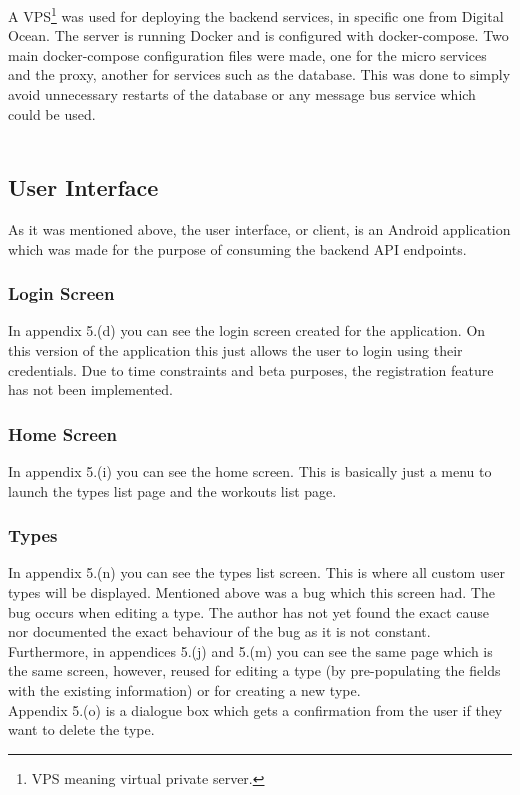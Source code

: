 \documentclass{article}
\newcommand{\vspaceconst}{-2ex}
\begin{document}
\begin{multicols}{2}
A VPS\footnote{VPS meaning virtual private server.} was used for deploying the backend services, in specific one from Digital Ocean\cite{digitalOcean}. The server is running Docker and is configured with docker-compose. Two main docker-compose configuration files were made, one for the micro services and the proxy, another for services such as the database. This was done to simply avoid unnecessary restarts of the database or any message bus service which could be used.\\
\\
\subsection{User Interface}
\vspace{\vspaceconst}

As it was mentioned above, the user interface, or client, is an Android application which was made for the purpose of consuming the backend API endpoints.\\

\subsubsection{Login Screen}
\vspace{\vspaceconst}

In appendix 5.(d) you can see the login screen created for the application. On this version of the application this just allows the user to login using their credentials. Due to time constraints and beta purposes, the registration feature has not been implemented.\\

\subsubsection{Home Screen}
\vspace{\vspaceconst}

In appendix 5.(i) you can see the home screen. This is basically just a menu to launch the types list page and the workouts list page.\\

\subsubsection{Types}
\vspace{\vspaceconst}

In appendix 5.(n) you can see the types list screen. This is where all custom user types will be displayed. Mentioned above was a bug which this screen had. The bug occurs when editing a type. The author has not yet found the exact cause nor documented the exact behaviour of the bug as it is not constant.\\
Furthermore, in appendices 5.(j) and 5.(m) you can see the same page which is the same screen, however, reused for editing a type (by pre-populating the fields with the existing information) or for creating a new type.\\
Appendix 5.(o) is a dialogue box which gets a confirmation from the user if they want to delete the type.\\


\end{multicols}
\end{document}
